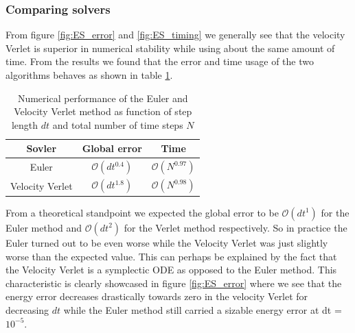\documentclass[american,a4paper,12pt]{article}
\begin{document}
\subsubsection{Comparing solvers}
From figure \ref{fig:ES_error} and \ref{fig:ES_timing} we generally see that the velocity Verlet is superior in numerical stability while using about the same amount of time. From the results we found that the error and time usage of the two algorithms behaves as shown in table \ref{tab:solver_comparison}.
\begin{table}[H]
  \begin{center}
  \caption{Numerical performance of the Euler and Velocity Verlet method as function of step length $dt$ and total number of time steps $N$}
  \label{tab:solver_comparison}
  \begin{tabular}{|c|c|c|} \hline
  \textbf{Sovler} & \textbf{Global error} & \textbf{Time} \\ \hline
  Euler & $\mathcal{O}(dt^{0.4})$ & $\mathcal{O}(N^{0.97})$  \\
  \hline
  Velocity Verlet & $\mathcal{O}(dt^{1.8})$ &  $\mathcal{O}(N^{0.98})$ \\
  \hline
  \end{tabular}
  \end{center}
\end{table}
From a theoretical standpoint we expected the global error to be $\mathcal{O}(dt^{1})$ for the Euler method and $\mathcal{O}(dt^{2})$ for the Verlet method respectively. So in practice the Euler turned out to be even worse while the Velocity Verlet was just slightly worse than the expected value. This can perhaps be explained by the fact that the Velocity Verlet is a symplectic ODE as opposed to the Euler method. This characteristic is clearly showcased in figure \ref{fig:ES_error} where we see that the energy error decreases drastically towards zero in the velocity Verlet for decreasing $dt$ while the Euler method still carried a sizable energy error at dt = $10^{-5}$. 
\end{document}
